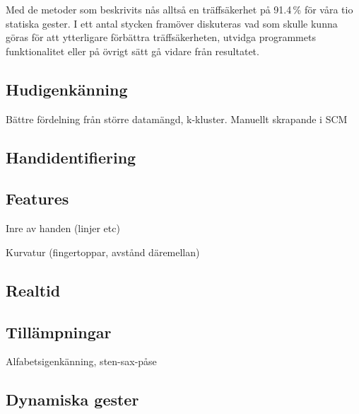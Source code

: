 \documentclass[../rapport_MVEX01-11-05]{subfiles}
\begin{document}
Med de metoder som beskrivits nås alltså en träffsäkerhet på 91.4\,\%
för våra tio statiska gester. I ett antal stycken framöver diskuteras
vad som skulle kunna göras för att ytterligare förbättra
träffsäkerheten, utvidga programmets funktionalitet eller på övrigt
sätt gå vidare från resultatet.

\subsection{Hudigenkänning}
Bättre fördelning från större datamängd, k-kluster.
Manuellt skrapande i SCM
\subsection{Handidentifiering}
\subsection{Features}
Inre av handen (linjer etc)

Kurvatur (fingertoppar, avstånd däremellan)

\subsection{Realtid}
\subsection{Tillämpningar}
Alfabetsigenkänning, sten-sax-påse

\subsection{Dynamiska gester}
\end{document}
